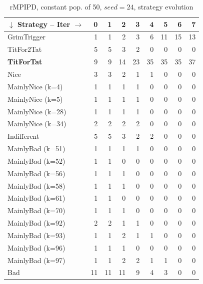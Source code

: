 \documentclass[journal,10pt,twoside]{IEEEtran}
\begin{document}
\begin{table}[ht]
    \caption{rMPIPD, constant pop. of 50, $seed = 24$, strategy evolution}
    \label{tab:ripdmp-const-24}
    \centering
    \begin{tabular}{l|rrrrrrrr} \toprule
        $\downarrow$ Strategy -- Iter $\rightarrow$  & 0 & 1 & 2 & 3 & 4 & 5 & 6 & 7 \\ \midrule
        GrimTrigger       &   1 &   1 &   2 &   3 &   6 &  11 &  15 &  13 \\
        TitFor2Tat        &   5 &   5 &   3 &   2 &   0 &   0 &   0 &   0 \\
        \textbf{TitForTat}&   9 &   9 &  14 &  23 &  35 &  35 &  35 &  37 \\
        Nice              &   3 &   3 &   2 &   1 &   1 &   0 &   0 &   0 \\
        MainlyNice (k=4)  &   1 &   1 &   1 &   1 &   0 &   0 &   0 &   0 \\
        MainlyNice (k=5)  &   1 &   1 &   1 &   1 &   0 &   0 &   0 &   0 \\
        MainlyNice (k=28) &   1 &   1 &   1 &   1 &   0 &   0 &   0 &   0 \\
        MainlyNice (k=34) &   2 &   2 &   2 &   2 &   0 &   0 &   0 &   0 \\
        Indifferent       &   5 &   5 &   3 &   2 &   2 &   0 &   0 &   0 \\
        MainlyBad (k=51)  &   1 &   1 &   1 &   1 &   0 &   0 &   0 &   0 \\
        MainlyBad (k=52)  &   1 &   1 &   0 &   0 &   0 &   0 &   0 &   0 \\
        MainlyBad (k=56)  &   1 &   1 &   1 &   0 &   0 &   0 &   0 &   0 \\
        MainlyBad (k=58)  &   1 &   1 &   1 &   0 &   0 &   0 &   0 &   0 \\
        MainlyBad (k=61)  &   1 &   1 &   0 &   0 &   0 &   0 &   0 &   0 \\
        MainlyBad (k=70)  &   1 &   1 &   1 &   0 &   0 &   0 &   0 &   0 \\
        MainlyBad (k=92)  &   2 &   2 &   1 &   1 &   0 &   0 &   0 &   0 \\
        MainlyBad (k=93)  &   1 &   1 &   2 &   1 &   1 &   0 &   0 &   0 \\
        MainlyBad (k=96)  &   1 &   1 &   1 &   0 &   0 &   0 &   0 &   0 \\
        MainlyBad (k=97)  &   1 &   1 &   2 &   2 &   1 &   1 &   0 &   0 \\
        Bad               &  11 &  11 &  11 &   9 &   4 &   3 &   0 &   0 \\ \bottomrule
    \end{tabular}
\end{table}
\end{document}
